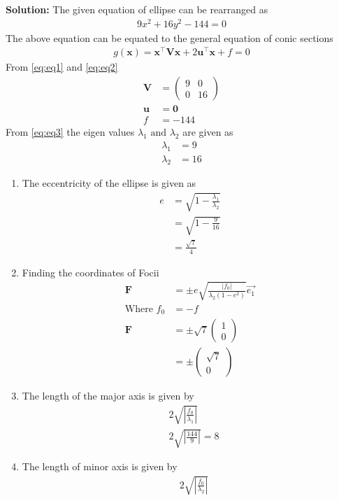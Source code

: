 \documentclass[12pt]{article}
\providecommand{\brak}[1]{\ensuremath{\left(#1\right)}}
\providecommand{\abs}[1]{\left\vert#1\right\vert}
\newcommand{\solution}{\noindent \textbf{Solution: }}
\newcommand{\myvec}[1]{\ensuremath{\begin{pmatrix}#1\end{pmatrix}}}
\let\vec\mathbf
\begin{document}
\begin{enumerate}
\solution
The given equation of ellipse can be rearranged as 
\begin{align}
 9x^2+16y^2-144=0\label{eq:eq1}
\end{align}
The above equation can be equated to the general equation of conic sections
\begin{align}
 g\brak{\vec{x}}=\vec{x}^\top \vec{V} \vec{x} + 2\vec{u}^\top \vec{x} + f = 0\label{eq:eq2}
\end{align}
From \eqref{eq:eq1} and \eqref{eq:eq2}
\begin{align}
 \vec{V} &= \myvec{9&0\\0&16}\label{eq:eq3}\\
 \vec{u} &= \vec{0}\\
 f &= -144
\end{align}
From \eqref{eq:eq3} the eigen values $\lambda_1 \text{ and } \lambda_2$ are given as
\begin{align}
 \lambda_1 &= 9\\
 \lambda_2 &= 16
\end{align}
\begin{enumerate}
\item The eccentricity of the ellipse is given as
\begin{align}
 e &= \sqrt{1 - \frac{\lambda_1}{\lambda_2}} \\
          &= \sqrt{1-\frac{9}{16}}\\
   &= \frac{\sqrt{7}}{4}
\end{align}
\item Finding the coordinates of Focii
\begin{align}
 \vec{F} &= \pm e\sqrt{\frac{\abs{f_0}}{\lambda_2\brak{1-e^2}}}\Vec{e_1}\\
\text{Where }f_0 &=-f\\
 \vec{F} &= \pm\sqrt{7}\myvec{1\\0}\\
	&= \pm\myvec{\sqrt{7}\\0}
\end{align}
\item The length of the major axis is given by
\begin{align}
 &2\sqrt{\abs{\frac{f_0}{\lambda_1}}}\\
        &2\sqrt{\abs{\frac{144}{9}}}= 8
\end{align}
\item The length of minor axis is given by
\begin{align}
 &2\sqrt{\abs{\frac{f_0}{\lambda_2}}}\\

\end{align}
\end{enumerate}
\end{enumerate}
\end{document}
